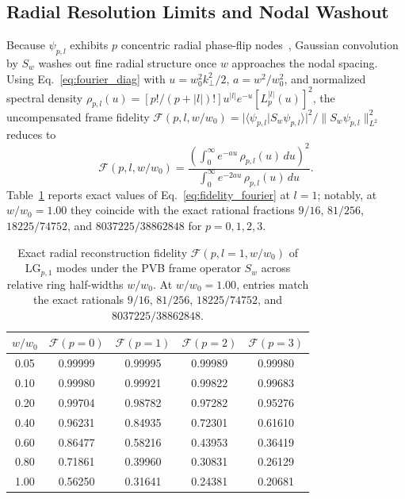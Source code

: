 \documentclass[aps,pra,onecolumn,notitlepage,11pt,tightenlines,amsmath,amssymb,floatfix,longbibliography]{revtex4-2}
\providecommand{\braket}[2]{\langle#1\vert#2\rangle}
\providecommand{\abs}[1]{\lvert#1\rvert}
\providecommand{\norm}[1]{\lVert#1\rVert}
\begin{document}
\subsection{Radial Resolution Limits and Nodal Washout}
\label{subsec:nodal_washout}

Because $\psi_{p,l}$ exhibits $p$ concentric radial phase-flip nodes~\cite{Allen1992,Siegman1986,Walborn2010}, Gaussian convolution by $S_w$ washes out fine radial structure once $w$ approaches the nodal spacing. Using Eq.~\eqref{eq:fourier_diag} with $u = w_0^2 k_\perp^2/2$, $a = w^2/w_0^2$, and normalized spectral density $\rho_{p,l}(u) = [p!/(p+\abs{l})!]u^{\abs{l}} e^{-u}[L_p^{\abs{l}}(u)]^2$, the uncompensated frame fidelity $\mathcal{F}(p,l,w/w_0) = \abs{\braket{\psi_{p,l}}{S_w\psi_{p,l}}}^2/\norm{S_w\psi_{p,l}}_{L^2}^2$ reduces to
\begin{equation}
\mathcal{F}(p,l,w/w_0) = \frac{\left(\int_0^\infty e^{-au}\,\rho_{p,l}(u)\,du\right)^2}{\int_0^\infty e^{-2au}\,\rho_{p,l}(u)\,du}.
\label{eq:fidelity_fourier}
\end{equation}
Table~\ref{tab:fidelity} reports exact values of Eq.~\eqref{eq:fidelity_fourier} at $l = 1$; notably, at $w/w_0 = 1.00$ they coincide with the exact rational fractions $9/16$, $81/256$, $18225/74752$, and $8037225/38862848$ for $p = 0,1,2,3$.

\begin{table}[t]
\caption{Exact radial reconstruction fidelity $\mathcal{F}(p, l=1, w/w_0)$ of $\mathrm{LG}_{p,1}$ modes under the PVB frame operator $S_w$ across relative ring half-widths $w/w_0$. At $w/w_0 = 1.00$, entries match the exact rationals $9/16$, $81/256$, $18225/74752$, and $8037225/38862848$.}
\label{tab:fidelity}
\begin{ruledtabular}
\setlength{\tabcolsep}{4pt}
\begin{tabular}{ccccc}
$w / w_0$ & $\mathcal{F}(p=0)$ & $\mathcal{F}(p=1)$ & $\mathcal{F}(p=2)$ & $\mathcal{F}(p=3)$ \\
\hline
0.05 & 0.99999 & 0.99995 & 0.99989 & 0.99980 \\
0.10 & 0.99980 & 0.99921 & 0.99822 & 0.99683 \\
0.20 & 0.99704 & 0.98782 & 0.97282 & 0.95276 \\
0.40 & 0.96231 & 0.84935 & 0.72301 & 0.61610 \\
0.60 & 0.86477 & 0.58216 & 0.43953 & 0.36419 \\
0.80 & 0.71861 & 0.39960 & 0.30831 & 0.26129 \\
1.00 & 0.56250 & 0.31641 & 0.24381 & 0.20681 \\
\end{tabular}
\end{ruledtabular}
\end{table}
\end{document}
